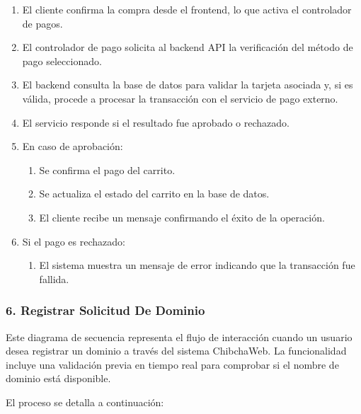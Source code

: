  \begin{enumerate}
 \item El cliente confirma la compra desde el frontend, lo que activa el controlador de pagos.
 \item El controlador de pago solicita al backend API la verificación del método de pago seleccionado.
 \item El backend consulta la base de datos para validar la tarjeta asociada y, si es válida, procede a procesar la transacción con el servicio de pago externo.
 \item El servicio responde si el resultado fue aprobado o rechazado.
 \item En caso de aprobación:
 \begin{enumerate}
     \item Se confirma el pago del carrito.
     \item Se actualiza el estado del carrito en la base de datos.
     \item El cliente recibe un mensaje confirmando el éxito de la operación.
 \end{enumerate}

 \item Si el pago es rechazado:
    \begin{enumerate}
    	\item El sistema muestra un mensaje de error indicando que la transacción fue fallida.
    \end{enumerate}
 \end{enumerate}

\subsubsection*{6. Registrar Solicitud De Dominio}

Este diagrama de secuencia representa el flujo de interacción cuando un usuario desea registrar un dominio a través del sistema ChibchaWeb. La funcionalidad incluye una validación previa en tiempo real para comprobar si el nombre de dominio está disponible.

El proceso se detalla a continuación:

